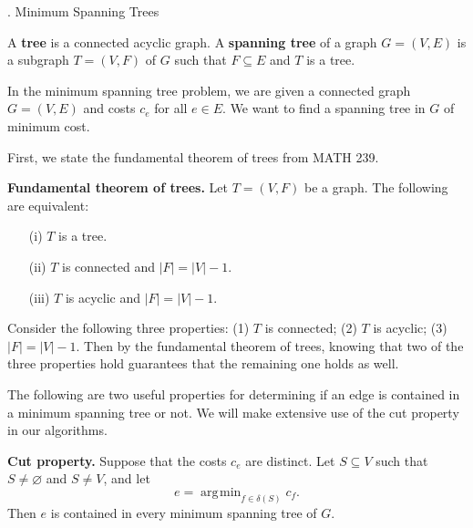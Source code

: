 \documentclass{article}
\DeclareMathOperator*{\argmin}{\arg\!\min}
\begin{document}
\newpage
\begin{center}
    {. Minimum Spanning Trees}
\end{center}

A {\bf tree} is a connected acyclic graph. A {\bf spanning tree} of a graph 
$G = (V, E)$ is a subgraph $T = (V, F)$ of $G$ such that $F \subseteq E$ and 
$T$ is a tree. 

In the minimum spanning tree problem, we are given a connected graph $G = (V, E)$
and costs $c_e$ for all $e \in E$. We want to find a spanning tree in $G$ 
of minimum cost.  

First, we state the fundamental theorem of trees from MATH 239. 

{\color{violet}
{\bf Fundamental theorem of trees.} Let $T = (V, F)$ be a graph. 
The following are equivalent: 
\begin{enumerate}
    \item [(i)] $T$ is a tree.
    \item [(ii)] $T$ is connected and $|F| = |V| - 1$. 
    \item [(iii)] $T$ is acyclic and $|F| = |V| - 1$. 
\end{enumerate}}

Consider the following three properties: (1) $T$ is 
connected; (2) $T$ is acyclic; (3) $|F| = |V| - 1$. Then 
by the fundamental theorem of trees, 
knowing that two of the three properties hold guarantees that the remaining one 
holds as well.

The following are two useful properties for determining if an edge 
is contained in a minimum spanning tree or not. We will make 
extensive use of the cut property in our algorithms.

{\color{violet}
{\bf Cut property.} Suppose that the costs $c_e$ are distinct. 
Let $S \subseteq V$ such that $S \neq \varnothing$ and $S \neq V$, and let 
\[ e = \argmin_{f \in \delta(S)} c_f. \]
Then $e$ is contained in every minimum spanning tree of $G$.}
\end{document}
